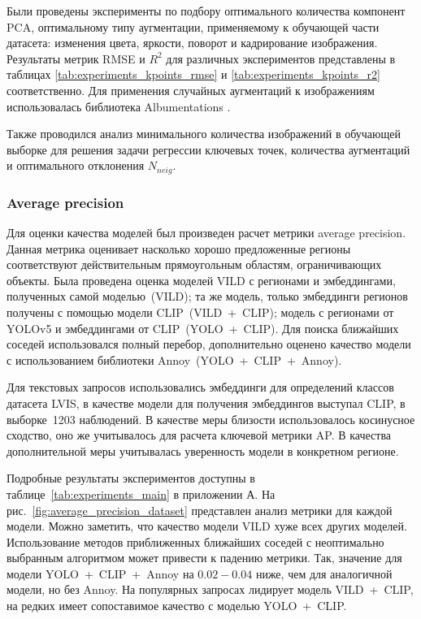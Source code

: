 \documentclass[a4paper,14pt]{article}
\begin{document}
    Были проведены эксперименты по подбору оптимального количества компонент PCA, оптимальному типу аугментации, применяемому к обучающей части датасета: изменения цвета, яркости, поворот и кадрирование изображения.
    Результаты метрик RMSE и $R^2$ для различных экспериментов представлены в таблицах \ref{tab:experiments_kpoints_rmse} и \ref{tab:experiments_kpoints_r2} соответственно. Для применения случайных аугментаций к изображениям использовалась библиотека Albumentations \cite{albumentations}.

    Также проводился анализ минимального количества изображений в обучающей выборке для решения задачи регрессии ключевых точек, количества аугментаций и оптимального отклонения $N_{neig}$.

    \subsubsection{Average precision}

    Для оценки качества моделей был произведен расчет метрики average precision.
    Данная метрика оценивает насколько хорошо предложенные регионы соответствуют действительным прямоугольным областям, ограничивающих объекты.
    Была проведена оценка моделей VILD с регионами и эмбеддингами, полученных самой моделью~(VILD);
    та же модель, только эмбеддинги регионов получены с помощью модели CLIP~(VILD~+~CLIP);
    модель с регионами от YOLOv5 и эмбеддингами от CLIP~(YOLO~+~CLIP).
    Для поиска ближайших соседей использовался полный перебор, дополнительно оценено качество модели с использованием библиотеки Annoy~(YOLO~+~CLIP~+~Annoy).

    Для текстовых запросов использовались эмбеддинги для определений классов датасета LVIS, в качестве модели для получения эмбеддингов выступал CLIP, в выборке~1203 наблюдений.
    В качестве меры близости использовалось косинусное сходство, оно же учитывалось для расчета ключевой метрики AP.
    В качества дополнительной меры учитывалась уверенность модели в конкретном регионе.

    Подробные результаты экспериментов доступны в таблице~\ref{tab:experiments_main} в приложении А.
    На рис.~\ref{fig:average_precision_dataset} представлен анализ метрики для каждой модели.
    Можно заметить, что качество модели VILD хуже всех других моделей.
    Использование методов приближенных ближайших соседей с неоптимально выбранным алгоритмом может привести к падению метрики.
    Так, значение для модели YOLO~+~CLIP~+~Annoy на $0.02 - 0.04$ ниже, чем для аналогичной модели, но без Annoy.
    На популярных запросах лидирует модель VILD~+~CLIP, на редких имеет сопоставимое качество с моделью YOLO~+~CLIP.
\end{document}
